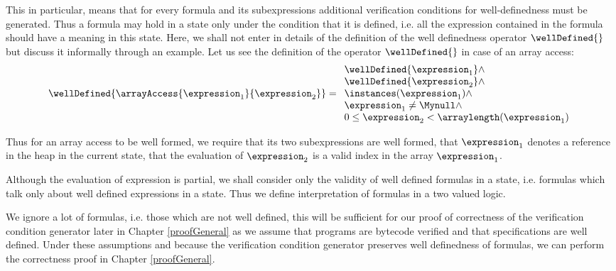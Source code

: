  This in particular, means that for every formula and its subexpressions additional verification conditions for well-definedness must be generated.
 Thus a formula may hold in a state only under the condition that
 it is  defined, i.e. all the expression contained in the formula should have a meaning in  this state.
  Here, we shall not enter in details of the definition of the well definedness operator  $\wellDefined{}$  but discuss it informally through an example.
   Let us see the definition of  the operator  $\wellDefined{}$   in case of an array access:
$$
\begin{array}{l}
 \wellDefined{ \arrayAccess{\expression_1} {\expression_2} } = 
            \begin{array}{l}
              \wellDefined{\expression_1} \wedge \\
     \wellDefined{\expression_2} \wedge \\
             \instances(\expression_1) \wedge \\
              \expression_1 \neq \Mynull \wedge\\
             0 \le  \expression_2 < \arraylength(\expression_1)
            \end{array} 
 \end{array}
$$

 Thus for an array access to be well formed, we require that its two subexpressions are well formed, that 
 $\expression_1$ denotes a reference in the heap in the current state, that the evaluation of $ \expression_2 $ is a valid index in the array 
 $\expression_1$. %
 
 Although the evaluation of expression is partial, we shall consider only the validity of well defined 
 formulas in a state, i.e. formulas which talk only about well defined expressions in a state. 
 Thus we define interpretation of formulas  in a two valued logic.
 
 We ignore a lot of formulas, i.e. those which are not well defined,
 this will be sufficient for our proof of correctness of the verification condition generator later in Chapter \ref{proofGeneral} as 
 we assume that programs are bytecode verified and that specifications
 are well defined. Under these assumptions and because the verification condition generator preserves well definedness of formulas, we 
 can perform the correctness proof in Chapter \ref{proofGeneral}.

